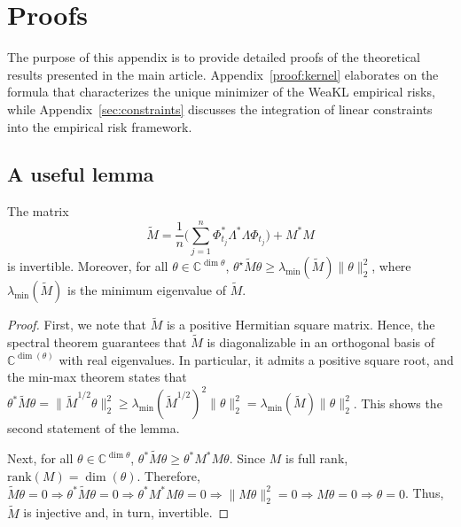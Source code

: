 
\section{Proofs}
The purpose of this appendix is to provide detailed proofs of the theoretical results presented in the main article. Appendix~\ref{proof:kernel} elaborates on the formula that characterizes the unique minimizer of the WeaKL empirical risks, while Appendix~\ref{sec:constraints} discusses the integration of linear constraints into the empirical risk framework.

\subsection{A useful lemma}
\begin{lemma}
    The matrix \[\tilde M = \frac{1}{n}\Big( \sum_{j=1}^n \mathbb \Phi_{t_j}^\ast \Lambda^\ast \Lambda\mathbb \Phi_{t_j}\Big) +  M^\ast M\] is invertible. Moreover, for all $\theta\in\mathbb C^{\dim \theta}$, $\theta^\star \tilde M \theta \geq \lambda_{\min}(\tilde M)\|\theta\|_2^2$, where $\lambda_{\min}(\tilde M)$ is the minimum eigenvalue of $\tilde M$.
    \label{lemma:full}
\end{lemma}
\begin{proof}
    First, we note that $\tilde M$ is a positive Hermitian square matrix. Hence, the spectral theorem guarantees that $\tilde M$ is diagonalizable in an orthogonal basis of $\mathbb C^{\dim(\theta)}$ with real eigenvalues. In particular, it admits a positive square root, and the min-max theorem states that $\theta^\ast \tilde M \theta = \|\tilde M^{1/2} \theta\|_2^2 \geq \lambda_{\min}(\tilde M^{1/2})^2\|\theta\|_2^2 = \lambda_{\min}(\tilde M)\|\theta\|_2^2$. This shows the second statement of the lemma.
    
    Next, for all $\theta \in \mathbb C^{\dim \theta}$, $\theta^\ast \tilde M \theta \geq \theta^\ast  M^\ast M \theta$.
    Since $M$ is full rank,  $\mathrm{rank}(M) = \dim(\theta)$. Therefore, $\tilde M \theta = 0 \Rightarrow \theta^\ast \tilde M \theta = 0 \Rightarrow \theta^\ast M^\ast M \theta = 0  \Rightarrow \|M\theta\|_2^2 = 0 \Rightarrow M\theta = 0 \Rightarrow \theta = 0$. Thus, $\tilde M$ is injective and, in turn, invertible.
\end{proof}


